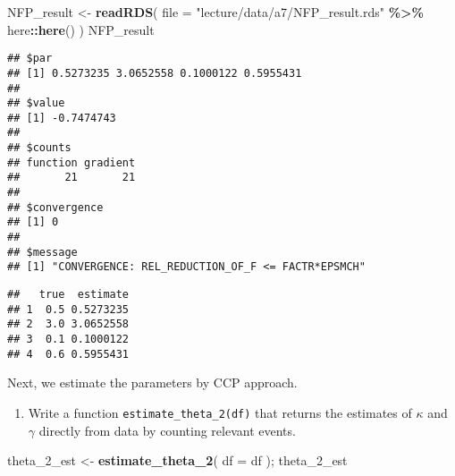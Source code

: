 \documentclass[
]{book}
\newenvironment{Shaded}{\begin{snugshade}}{\end{snugshade}}
\newcommand{\AttributeTok}[1]{\textcolor[rgb]{0.13,0.29,0.53}{#1}}
\newcommand{\FunctionTok}[1]{\textcolor[rgb]{0.13,0.29,0.53}{\textbf{#1}}}
\newcommand{\NormalTok}[1]{#1}
\newcommand{\OtherTok}[1]{\textcolor[rgb]{0.56,0.35,0.01}{#1}}
\newcommand{\SpecialCharTok}[1]{\textcolor[rgb]{0.81,0.36,0.00}{\textbf{#1}}}
\newcommand{\StringTok}[1]{\textcolor[rgb]{0.31,0.60,0.02}{#1}}
\providecommand{\tightlist}{%
  \setlength{\itemsep}{0pt}\setlength{\parskip}{0pt}}
\begin{document}
\begin{Shaded}
\begin{Highlighting}[]
\NormalTok{NFP\_result }\OtherTok{\textless{}{-}} 
  \FunctionTok{readRDS}\NormalTok{(}
    \AttributeTok{file =} \StringTok{"lecture/data/a7/NFP\_result.rds"} \SpecialCharTok{\%\textgreater{}\%}\NormalTok{ here}\SpecialCharTok{::}\FunctionTok{here}\NormalTok{()}
\NormalTok{  )}
\NormalTok{NFP\_result}
\end{Highlighting}
\end{Shaded}

\begin{verbatim}
## $par
## [1] 0.5273235 3.0652558 0.1000122 0.5955431
## 
## $value
## [1] -0.7474743
## 
## $counts
## function gradient 
##       21       21 
## 
## $convergence
## [1] 0
## 
## $message
## [1] "CONVERGENCE: REL_REDUCTION_OF_F <= FACTR*EPSMCH"
\end{verbatim}

\begin{Shaded}
\end{Shaded}

\begin{verbatim}
##   true  estimate
## 1  0.5 0.5273235
## 2  3.0 3.0652558
## 3  0.1 0.1000122
## 4  0.6 0.5955431
\end{verbatim}

Next, we estimate the parameters by CCP approach.

\begin{enumerate}
\def\labelenumi{\arabic{enumi}.}
\setcounter{enumi}{4}
\tightlist
\item
  Write a function \texttt{estimate\_theta\_2(df)} that returns the estimates of \(\kappa\) and \(\gamma\) directly from data by counting relevant events.
\end{enumerate}

\begin{Shaded}
\begin{Highlighting}[]
\NormalTok{theta\_2\_est }\OtherTok{\textless{}{-}} 
  \FunctionTok{estimate\_theta\_2}\NormalTok{(}
    \AttributeTok{df =}\NormalTok{ df}
\NormalTok{  ); }
\NormalTok{theta\_2\_est}
\end{Highlighting}
\end{Shaded}
\end{document}
